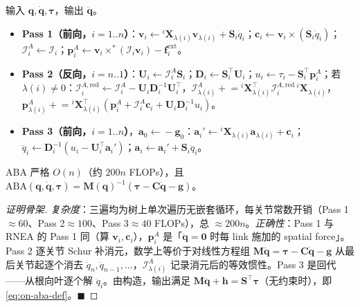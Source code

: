 \begin{algo}\label{algo:on-aba}
输入 $\mathbf q,\dot{\mathbf q},\boldsymbol\tau$，输出 $\ddot{\mathbf q}$。
\begin{itemize}
  \item \textbf{Pass 1（前向，$i=1..n$）}：$\mathbf v_i\!\leftarrow\!{}^i\mathbf X_{\lambda(i)}\mathbf v_{\lambda(i)}+\mathbf S_i\dot q_i$；$\mathbf c_i\!\leftarrow\!\mathbf v_i\times(\mathbf S_i\dot q_i)$；$\mathcal I_i^A\!\leftarrow\!\mathcal I_i$；$\mathbf p_i^A\!\leftarrow\!\mathbf v_i\times^*(\mathcal I_i\mathbf v_i)-\mathbf f_i^{\text{ext}}$。
  \item \textbf{Pass 2（反向，$i=n..1$）}：$\mathbf U_i\!\leftarrow\!\mathcal I_i^A\mathbf S_i$；$\mathbf D_i\!\leftarrow\!\mathbf S_i^\top\mathbf U_i$；$u_i\!\leftarrow\!\tau_i-\mathbf S_i^\top\mathbf p_i^A$；若 $\lambda(i)\neq0$：$\mathcal I_i^{A,\mathrm{red}}\!\leftarrow\!\mathcal I_i^A-\mathbf U_i\mathbf D_i^{-1}\mathbf U_i^\top$，$\mathcal I_{\lambda(i)}^A\mathrel{+}={}^i\mathbf X_{\lambda(i)}^\top\mathcal I_i^{A,\mathrm{red}}\,{}^i\mathbf X_{\lambda(i)}$，$\mathbf p_{\lambda(i)}^A\mathrel{+}={}^i\mathbf X_{\lambda(i)}^\top(\mathbf p_i^A+\mathcal I_i^A\mathbf c_i+\mathbf U_i\mathbf D_i^{-1}u_i)$。
  \item \textbf{Pass 3（前向，$i=1..n$）}，$\mathbf a_0\!\leftarrow\!-\mathbf g_0$：$\mathbf a_i'\!\leftarrow\!{}^i\mathbf X_{\lambda(i)}\mathbf a_{\lambda(i)}+\mathbf c_i$；$\ddot q_i\!\leftarrow\!\mathbf D_i^{-1}(u_i-\mathbf U_i^\top\mathbf a_i')$；$\mathbf a_i\!\leftarrow\!\mathbf a_i'+\mathbf S_i\ddot q_i$。
\end{itemize}
\end{algo}

\begin{theorem}\label{thm:on-aba}
ABA 严格 $O(n)$（约 $200n$ FLOPs），且 $\mathrm{ABA}(\mathbf q,\dot{\mathbf q},\boldsymbol\tau)=\mathbf M(\mathbf q)^{-1}(\boldsymbol\tau-\mathbf C\dot{\mathbf q}-\mathbf g)$。
\end{theorem}
\begin{proof}[证明骨架]
\emph{复杂度}：三遍均为树上单次遍历无嵌套循环，每关节常数开销（Pass 1$\approx60$、Pass 2$\approx100$、Pass 3$\approx40$ FLOPs），总 $\approx200n$。\emph{正确性}：Pass 1 与 RNEA 的 Pass 1 同（算 $\mathbf v_i,\mathbf c_i$），$\mathbf p_i^A$ 是「$\ddot{\mathbf q}=\mathbf 0$ 时每 link 施加的 spatial force」。Pass 2 逐关节 Schur 补消元，数学上等价于对线性方程组 $\mathbf M\ddot{\mathbf q}=\boldsymbol\tau-\mathbf C\dot{\mathbf q}-\mathbf g$ 从最后关节起逐个消去 $\ddot q_n,\ddot q_{n-1},\dots$，$\mathcal I_{\lambda(i)}^A$ 记录消元后的等效惯性。Pass 3 是回代——从根向叶逐个解 $\ddot q_i$。由构造，输出满足 $\mathbf M\ddot{\mathbf q}+\mathbf h=\mathbf S^\top\boldsymbol\tau$（无约束时），即 \cref{eq:on-aba-def}。$\blacksquare$
\end{proof}

